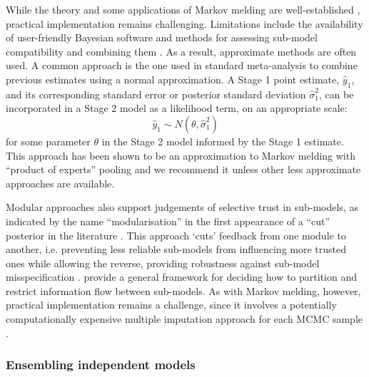 \documentclass{article}
\begin{document}
While the theory and some applications of Markov melding are well-established \citep{goudie2019joining,nicholson2022interoperability,manderson2023combining}, practical implementation remains challenging. Limitations include the availability of user-friendly Bayesian software and methods for assessing sub-model compatibility and combining them \citep{goudie2019joining,yang2025detecting}. As a result, approximate methods are often used. A common approach is the one used in standard meta-analysis \citep{borenstein2021introduction} to combine previous estimates using a normal approximation. A Stage 1 point estimate, $\hat{y}_1$, and its corresponding standard error or posterior standard deviation $\hat{\sigma}^2_1$, can be incorporated in a Stage 2 model as a likelihood term, on an appropriate scale:
$$
\hat{y}_1 \sim N(\theta, \hat{\sigma}^2_1)
$$ for some parameter $\theta$ in the Stage 2 model informed by the Stage 1 estimate. This approach has been shown to be an approximation to Markov melding with ``product of experts'' pooling \citep{goudie2019joining} and we recommend it unless other less approximate approaches are available.

Modular approaches also support judgements of selective trust in sub-models, as indicated by the name ``modularisation'' in the first appearance of a ``cut'' posterior in the literature \citep{LiuEtAl2009}. This approach `cuts' feedback from one module to another, i.e. preventing less reliable sub-models from influencing more trusted ones while allowing the reverse, providing robustness against sub-model misspecification \citep{plummer2015cuts,carmona2022scalable,yu2023variational}. \citet{liu2025general} provide a general framework for deciding how to partition and restrict information flow between sub-models. As with Markov melding, however, practical implementation remains a challenge, since it involves a potentially computationally expensive multiple imputation approach for each \ac{MCMC} sample \citep{plummer2015cuts}.

\subsubsection{Ensembling independent models}\label{sec:ensembling}
\end{document}
